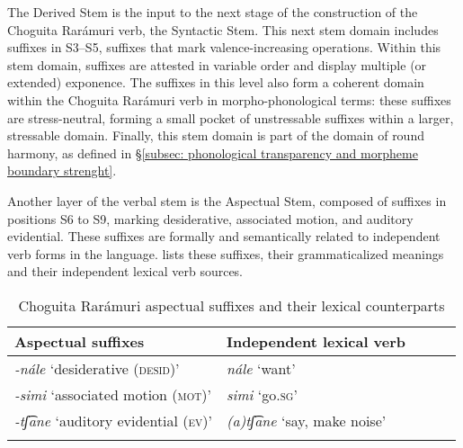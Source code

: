 The Derived Stem is the input to the next stage of the construction of the Choguita Rarámuri verb, the Syntactic Stem. This next stem domain includes suffixes in S3--S5, suffixes that mark valence-increasing operations. Within this stem domain, suffixes are attested in variable order and display multiple (or extended) exponence. The suffixes in this level also form a coherent domain within the Choguita Rarámuri verb in morpho-phonological terms: these suffixes are stress-neutral, forming a small pocket of unstressable suffixes within a larger, stressable domain. Finally, this stem domain is part of the domain of round harmony, as defined in §\ref{subsec: phonological transparency and morpheme boundary strenght}.

Another layer of the verbal stem is the Aspectual Stem, composed of suffixes in positions S6 to S9, marking desiderative, associated motion, and auditory evidential. These suffixes are formally and semantically related to independent verb forms in the language.  lists these suffixes, their grammaticalized meanings and their independent lexical verb sources.

\begin{table}
\caption{Choguita Rarámuri aspectual suffixes and their lexical counterparts}
\label{tab:aspectual-suffixes}

\begin{tabularx}{\textwidth}{XXXXX}
\lsptoprule

\textbf{Aspectual suffixes} & \textbf{Independent lexical verb}\\
\midrule
\textit{-nále}	`desiderative (\textsc{desid})' & \textit{nále} `want'\\
\textit{-simi} `associated motion (\textsc{mot})' & \textit{simi} `go.\textsc{sg}'\\
\textit{-tʃ͡ane} `auditory evidential (\textsc{ev})' & \textit{(a)tʃ͡ane} `say, make noise'\\
\lspbottomrule
\end{tabularx}
\end{table}

